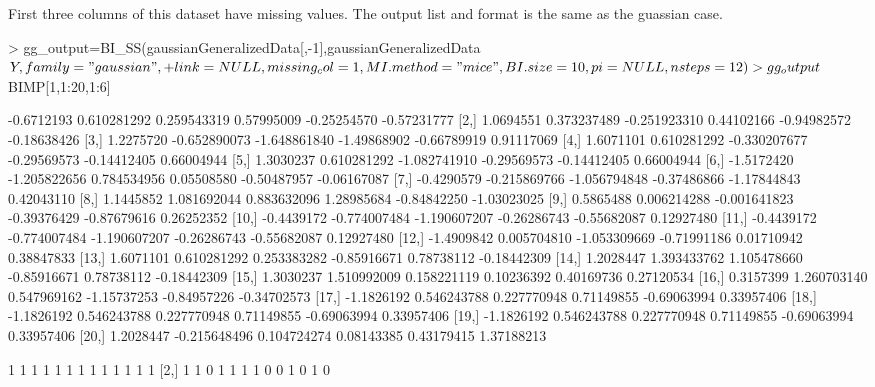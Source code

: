\documentclass[a4paper]{article}
\begin{document}
First three columns of this dataset have missing values.  The output list and format is the same as the guassian case.
\begin{Schunk}
\begin{Sinput}
> gg_output=BI_SS(gaussianGeneralizedData[,-1],gaussianGeneralizedData$Y,family="gaussian",
+                 link=NULL,missing_col=1,MI.method="mice",BI.size=10,pi=NULL,nsteps=12)
> gg_output$BIMP[1,1:20,1:6]
\end{Sinput}
\begin{Soutput}
            [,1]         [,2]         [,3]        [,4]        [,5]        [,6]
 [1,] -0.6712193  0.610281292  0.259543319  0.57995009 -0.25254570 -0.57231777
 [2,]  1.0694551  0.373237489 -0.251923310  0.44102166 -0.94982572 -0.18638426
 [3,]  1.2275720 -0.652890073 -1.648861840 -1.49868902 -0.66789919  0.91117069
 [4,]  1.6071101  0.610281292 -0.330207677 -0.29569573 -0.14412405  0.66004944
 [5,]  1.3030237  0.610281292 -1.082741910 -0.29569573 -0.14412405  0.66004944
 [6,] -1.5172420 -1.205822656  0.784534956  0.05508580 -0.50487957 -0.06167087
 [7,] -0.4290579 -0.215869766 -1.056794848 -0.37486866 -1.17844843  0.42043110
 [8,]  1.1445852  1.081692044  0.883632096  1.28985684 -0.84842250 -1.03023025
 [9,]  0.5865488  0.006214288 -0.001641823 -0.39376429 -0.87679616  0.26252352
[10,] -0.4439172 -0.774007484 -1.190607207 -0.26286743 -0.55682087  0.12927480
[11,] -0.4439172 -0.774007484 -1.190607207 -0.26286743 -0.55682087  0.12927480
[12,] -1.4909842  0.005704810 -1.053309669 -0.71991186  0.01710942  0.38847833
[13,]  1.6071101  0.610281292  0.253383282 -0.85916671  0.78738112 -0.18442309
[14,]  1.2028447  1.393433762  1.105478660 -0.85916671  0.78738112 -0.18442309
[15,]  1.3030237  1.510992009  0.158221119  0.10236392  0.40169736  0.27120534
[16,]  0.3157399  1.260703140  0.547969162 -1.15737253 -0.84957226 -0.34702573
[17,] -1.1826192  0.546243788  0.227770948  0.71149855 -0.69063994  0.33957406
[18,] -1.1826192  0.546243788  0.227770948  0.71149855 -0.69063994  0.33957406
[19,] -1.1826192  0.546243788  0.227770948  0.71149855 -0.69063994  0.33957406
[20,]  1.2028447 -0.215648496  0.104724274  0.08143385  0.43179415  1.37188213
\end{Soutput}
\begin{Soutput}
      [,1] [,2] [,3] [,4] [,5] [,6] [,7] [,8] [,9] [,10] [,11] [,12] [,13]
 [1,]    1    1    1    1    1    1    1    1    1     1     1     1     1
 [2,]    1    1    0    1    1    1    1    0    0     1     0     1     0

\end{Soutput}
\end{Schunk}
\end{document}

